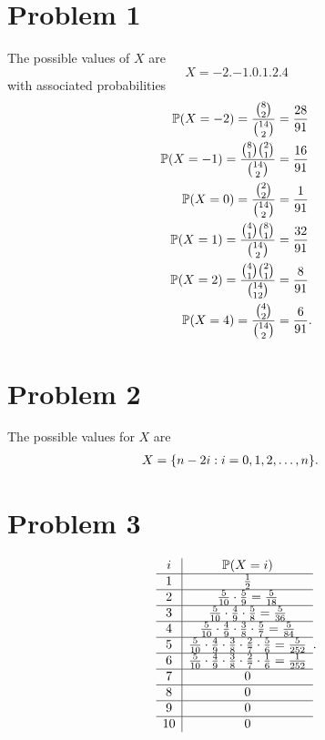 \documentclass[12pt]{extarticle}
\begin{document}
\section*{Problem 1}

The possible values of $X$ are
\[
	X = \qty{-2, -1, 0, 1, 2, 4}
\]
with associated probabilities
\begin{align*}
		\mathbb{P}\qty(X = -2) = \frac{\binom{8}{2}}{\binom{14}{2}} &= \frac{28}{91} \\
		\mathbb{P}\qty(X = -1) = \frac{\binom{8}{1} \binom{2}{1}}{\binom{14}{2}} &= \frac{16}{91} \\
		\mathbb{P}\qty(X =  0) = \frac{\binom{2}{2}}{\binom{14}{2}} &= \frac{1}{91} \\
		\mathbb{P}\qty(X =  1) = \frac{\binom{4}{1} \binom{8}{1}}{\binom{14}{2}} &= \frac{32}{91} \\
		\mathbb{P}\qty(X =  2) = \frac{\binom{4}{1} \binom{2}{1}}{\binom{14}{12}} &= \frac{8}{91} \\
		\mathbb{P}\qty(X =  4) = \frac{\binom{4}{2}}{\binom{14}{2}} &= \frac{6}{91}
.\end{align*}

\section*{Problem 2}
The possible values for $X$ are
\begin{align*}
	X &= \qty{n - 2i : i = 0, 1, 2, \ldots, n }
.\end{align*}


\section*{Problem 3}
{
	\renewcommand{\arraystretch}{1.5}
\[
	\begin{array}{c|c}
		i  & \mathbb{P}\qty(X = i) \\\hline
		1  & \frac{1}{2} \\\hline
		2  & \frac{5}{10} \cdot \frac{5}{9} = \frac{5}{18} \\\hline
		3  & \frac{5}{10} \cdot \frac{4}{9} \cdot \frac{5}{8} = \frac{5}{36} \\\hline
		4  & \frac{5}{10} \cdot \frac{4}{9} \cdot \frac{3}{8} \cdot \frac{5}{7} = \frac{5}{84} \\\hline
		5  & \frac{5}{10} \cdot \frac{4}{9} \cdot \frac{3}{8} \cdot\frac{2}{7} \cdot \frac{5}{6} = \frac{5}{252} \\\hline
		6  & \frac{5}{10} \cdot \frac{4}{9} \cdot \frac{3}{8} \cdot \frac{2}{7} \cdot \frac{1}{6} = \frac{1}{252} \\\hline
		7  & 0 \\\hline
		8  & 0 \\\hline
		9  & 0 \\\hline
		10 & 0
	\end{array}
.\]
}
\end{document}
